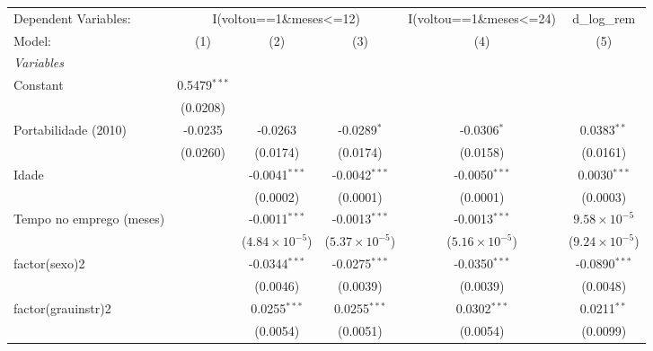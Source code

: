 
\begingroup
\centering
\begin{tabular}{lccccc}
   \tabularnewline \midrule \midrule
   Dependent Variables: & \multicolumn{3}{c}{I(voltou==1\&meses<=12)} & I(voltou==1\&meses<=24) & d\_log\_rem\\
   Model:                   & (1)            & (2)                     & (3)                     & (4)                     & (5)\\  
   \midrule
   \emph{Variables}\\
   Constant                 & 0.5479$^{***}$ &                         &                         &                         &   \\   
                            & (0.0208)       &                         &                         &                         &   \\   
   Portabilidade (2010)     & -0.0235        & -0.0263                 & -0.0289$^{*}$           & -0.0306$^{*}$           & 0.0383$^{**}$\\   
                            & (0.0260)       & (0.0174)                & (0.0174)                & (0.0158)                & (0.0161)\\   
   Idade                    &                & -0.0041$^{***}$         & -0.0042$^{***}$         & -0.0050$^{***}$         & 0.0030$^{***}$\\   
                            &                & (0.0002)                & (0.0001)                & (0.0001)                & (0.0003)\\   
   Tempo no emprego (meses) &                & -0.0011$^{***}$         & -0.0013$^{***}$         & -0.0013$^{***}$         & $9.58\times 10^{-5}$\\    
                            &                & ($4.84\times 10^{-5}$)  & ($5.37\times 10^{-5}$)  & ($5.16\times 10^{-5}$)  & ($9.24\times 10^{-5}$)\\    
   factor(sexo)2            &                & -0.0344$^{***}$         & -0.0275$^{***}$         & -0.0350$^{***}$         & -0.0890$^{***}$\\   
                            &                & (0.0046)                & (0.0039)                & (0.0039)                & (0.0048)\\   
   factor(grauinstr)2       &                & 0.0255$^{***}$          & 0.0255$^{***}$          & 0.0302$^{***}$          & 0.0211$^{**}$\\   
                            &                & (0.0054)                & (0.0051)                & (0.0054)                & (0.0099)\\   

\end{tabular}
